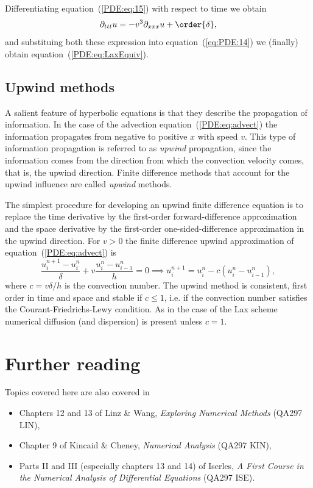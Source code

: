 %
Differentiating equation~(\ref{PDE:eq:15}) with respect to time we
obtain
%
\begin{equation*}
  \partial_{t t t} u = -v^3 \partial_{x x x} u + \order{\delta} ,
\end{equation*}
%
and substituing both these expression into equation~(\ref{eq:PDE:14})
we (finally) obtain equation~(\ref{PDE:eq:LaxEquiv}).

\subsection{Upwind methods}

A salient feature of hyperbolic equations is that they describe the
propagation of information.  In the case of the advection
equation~(\ref{PDE:eq:advect}) the information propagates from
negative to positive $x$ with speed $v$.  This type of information
propagation is referred to as \textit{upwind} propagation, since the
information comes from the direction from which the convection
velocity comes, that is, the upwind direction.  Finite difference
methods that account for the upwind influence are called
\textit{upwind} methods.

The simplest procedure for developing an upwind finite difference
equation is to replace the time derivative by the first-order
forward-difference approximation and the space derivative by the
first-order one-sided-difference approximation in the upwind
direction.  For $v > 0$ the finite difference upwind approximation of
equation~(\ref{PDE:eq:advect}) is
%
\begin{equation}
  \frac{u_{i}^{n+1}-u_{i}^{n}}{\delta} + v
  \frac{u_{i}^{n} - u_{i-1}^{n}}{h} = 0 \implies
  u_{i}^{n+1} = u_{i}^{n} - c ( u_{i}^{n} - u_{i-1}^{n} ) ,
  \label{eq:PDE:Upw}
\end{equation}
%
where $c=v \delta/h$ is the convection number.  The upwind method is
consistent, first order in time and space and stable if $c \le 1$,
i.e. if the convection number satisfies the Courant-Friedrichs-Lewy
condition.  As in the case of the Lax scheme numerical diffusion (and
dispersion) is present unless $c=1$.

\section*{Further reading}

Topics covered here are also covered in
\begin{itemize}
\item Chapters 12 and 13 of Linz \& Wang, \textit{Exploring Numerical
    Methods} (QA297 LIN),
\item Chapter 9 of Kincaid \& Cheney, \textit{Numerical Analysis}
  (QA297 KIN),
\item Parts II and III (especially chapters 13 and 14) of Iserles,
  \textit{A First Course in the Numerical Analysis of Differential
    Equations} (QA297 ISE).
\end{itemize}

